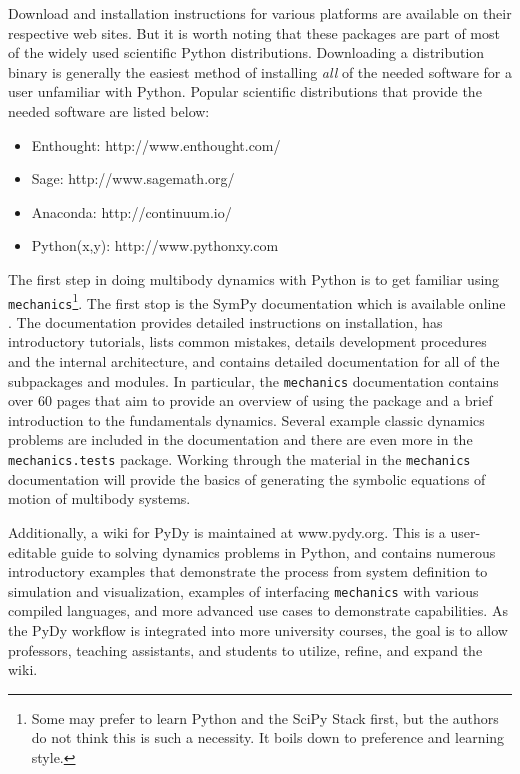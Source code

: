 \documentclass[twocolumn,10pt,final]{asme2e}
\begin{document}
Download and installation instructions for various platforms are available on
their respective web sites. But it is worth noting that these packages are part
of most of the widely used scientific Python distributions. Downloading a
distribution binary is generally the easiest method of installing \emph{all} of
the needed software for a user unfamiliar with Python. Popular scientific
distributions that provide the needed software are listed below:
%
\begin{itemize}
  \item Enthought: http://www.enthought.com/
  \item Sage: http://www.sagemath.org/
  \item Anaconda: http://continuum.io/
  \item Python(x,y): http://www.pythonxy.com
\end{itemize}

The first step in doing multibody dynamics with Python is to get familiar using
\verb|mechanics|\footnote{Some may prefer to learn Python and the SciPy Stack
first, but the authors do not think this is such a necessity. It boils down to
preference and learning style.}. The first stop is the SymPy documentation which
is available online \cite{SymPyDocs}. The documentation provides detailed
instructions on installation, has introductory tutorials, lists common
mistakes, details development procedures and the internal architecture, and
contains detailed documentation for all of the subpackages and modules. In
particular, the \verb|mechanics| documentation contains over 60 pages that aim
to provide an overview of using the package and a brief introduction to the
fundamentals dynamics. Several example classic dynamics problems are included
in the documentation and there are even more in the \verb|mechanics.tests|
package. Working through the material in the \verb|mechanics| documentation
will provide the basics of generating the symbolic equations of motion of
multibody systems.

Additionally, a wiki for PyDy is maintained at www.pydy.org. This is a
user-editable guide to solving dynamics problems in Python, and contains
numerous introductory examples that demonstrate the process from system
definition to simulation and visualization, examples of interfacing
\verb|mechanics| with various compiled languages, and more advanced use cases
to demonstrate capabilities. As the PyDy workflow is integrated into more
university courses, the goal is to allow professors, teaching assistants, and
students to utilize, refine, and expand the wiki.
\end{document}
